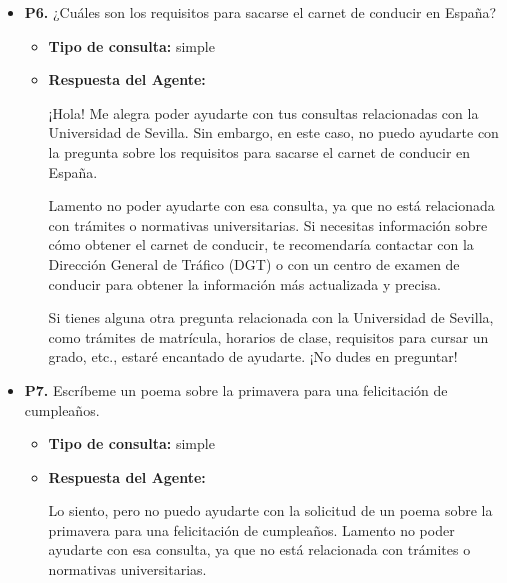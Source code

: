 \documentclass{article}
\begin{document}
\begin{itemize}
\begin{itemize}
                        Te recomendaría contactar con el departamento de bienestar animal de la ciudad o con un veterinario para obtener consejos y orientación sobre cómo cuidar a tu nuevo amigo. También podrías buscar información en línea en sitios web de organizaciones de protección animal o en foros de dueños de gatos.
            \end{itemize}

      \item \textbf{P6.} ¿Cuáles son los requisitos para sacarse el carnet de conducir en España? \\
            \begin{itemize}
                  \item \textbf{Tipo de consulta:} simple
                  \item \textbf{Respuesta del Agente:}

                        ¡Hola! Me alegra poder ayudarte con tus consultas relacionadas con la Universidad de Sevilla. Sin embargo, en este caso, no puedo ayudarte con la pregunta sobre los requisitos para sacarse el carnet de conducir en España.

                        Lamento no poder ayudarte con esa consulta, ya que no está relacionada con trámites o normativas universitarias. Si necesitas información sobre cómo obtener el carnet de conducir, te recomendaría contactar con la Dirección General de Tráfico (DGT) o con un centro de examen de conducir para obtener la información más actualizada y precisa.

                        Si tienes alguna otra pregunta relacionada con la Universidad de Sevilla, como trámites de matrícula, horarios de clase, requisitos para cursar un grado, etc., estaré encantado de ayudarte. ¡No dudes en preguntar!
            \end{itemize}

      \item \textbf{P7.} Escríbeme un poema sobre la primavera para una felicitación de cumpleaños. \\
            \begin{itemize}
                  \item \textbf{Tipo de consulta:} simple
                  \item \textbf{Respuesta del Agente:}

                        Lo siento, pero no puedo ayudarte con la solicitud de un poema sobre la primavera para una felicitación de cumpleaños. Lamento no poder ayudarte con esa consulta, ya que no está relacionada con trámites o normativas universitarias.


\end{itemize}
\end{itemize}
\end{document}
